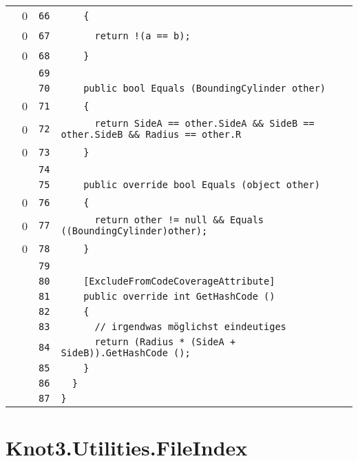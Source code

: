 \documentclass[a4paper,10pt]{article}
\begin{document}
\begin{longtable}[l]{lrrl}
\cellcolor{red} & 0 & \verb~66~ & \verb~    {~\\
\cellcolor{red} & 0 & \verb~67~ & \verb~      return !(a == b);~\\
\cellcolor{red} & 0 & \verb~68~ & \verb~    }~\\
\cellcolor{gray} &  & \verb~69~ & \verb~~\\
\cellcolor{gray} &  & \verb~70~ & \verb~    public bool Equals (BoundingCylinder other)~\\
\cellcolor{red} & 0 & \verb~71~ & \verb~    {~\\
\cellcolor{red} & 0 & \verb~72~ & \verb~      return SideA == other.SideA && SideB == other.SideB && Radius == other.R~\\
\cellcolor{red} & 0 & \verb~73~ & \verb~    }~\\
\cellcolor{gray} &  & \verb~74~ & \verb~~\\
\cellcolor{gray} &  & \verb~75~ & \verb~    public override bool Equals (object other)~\\
\cellcolor{red} & 0 & \verb~76~ & \verb~    {~\\
\cellcolor{red} & 0 & \verb~77~ & \verb~      return other != null && Equals ((BoundingCylinder)other);~\\
\cellcolor{red} & 0 & \verb~78~ & \verb~    }~\\
\cellcolor{gray} &  & \verb~79~ & \verb~~\\
\cellcolor{gray} &  & \verb~80~ & \verb~    [ExcludeFromCodeCoverageAttribute]~\\
\cellcolor{gray} &  & \verb~81~ & \verb~    public override int GetHashCode ()~\\
\cellcolor{gray} &  & \verb~82~ & \verb~    {~\\
\cellcolor{gray} &  & \verb~83~ & \verb~      // irgendwas möglichst eindeutiges~\\
\cellcolor{gray} &  & \verb~84~ & \verb~      return (Radius * (SideA + SideB)).GetHashCode ();~\\
\cellcolor{gray} &  & \verb~85~ & \verb~    }~\\
\cellcolor{gray} &  & \verb~86~ & \verb~  }~\\
\cellcolor{gray} &  & \verb~87~ & \verb~}~\\
\end{longtable}
\newpage
\section{Knot3.Utilities.FileIndex}
\end{document}

